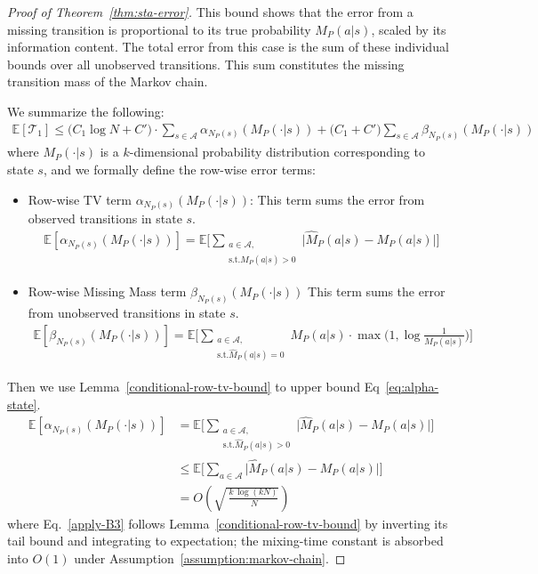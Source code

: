 \documentclass{article}
\theoremstyle{plain}
\theoremstyle{definition}
\theoremstyle{remark}
\begin{document}
\begin{proof}[Proof of Theorem~\ref{thm:sta-error}]
This bound shows that the error from a missing transition is proportional to its true probability $M_P(a|s)$, scaled by its information content. The total error from this case is the sum of these individual bounds over all unobserved transitions. This sum constitutes the missing transition mass of the Markov chain.


We summarize the following: 
\begin{align}
    \mathbb E[\mathcal{T}_1] \leq\big(C_1\log N+C'\big)\cdot\sum_{s\in \mathcal{A}}\alpha_{N_P(s)}(M_P(\cdot|s))+\big(C_1+C'\big)\sum_{s\in \mathcal{A}}\beta_{N_P(s)}(M_P(\cdot|s)) \label{eq:Expectation-T1}
\end{align}
where $M_P(\cdot|s)$ is a $k$-dimensional probability distribution corresponding to state $s$, and we formally define the row-wise error terms:


 \begin{itemize}
    \item Row-wise TV term $\alpha_{N_P(s)}(M_P(\cdot|s))$: This term sums the error from observed transitions in state $s$.
    \begin{align}
        \mathbb E[\alpha_{N_P(s)}(M_P(\cdot|s))]  = \mathbb E \bigg[ \sum_{\substack{a \in \mathcal{A}, \\ \text{s.t.} \hat M_P(a|s)>0} } \big|\hat M_P(a|s)-M_P(a|s)\big|\bigg] \label{eq:alpha-state}
    \end{align}
    \item Row-wise Missing Mass term $\beta_{N_P(s)}(M_P(\cdot|s))$ This term sums the error from unobserved transitions in state $s$.
    \begin{align}
        \mathbb E[\beta_{N_P(s)}(M_P(\cdot|s))]= \mathbb E \bigg[ \sum_{\substack{a \in \mathcal{A}, \\ \text{s.t.} \hat M_P(a|s)=0} } M_P(a|s) \cdot \max \Big(1,\log \frac{1}{M_P(a|s)}\Big)\bigg]
    \end{align}
\end{itemize}
Then we use Lemma~\ref{conditional-row-tv-bound} to upper bound Eq~\ref{eq:alpha-state}.
\begin{align}
    \mathbb E[\alpha_{N_P(s)}(M_P(\cdot|s))] &= \mathbb E \bigg[ \sum_{\substack{a \in \mathcal{A}, \\ \text{s.t.} \hat M_P(a|s)>0} } \big|\hat M_P(a|s)-M_P(a|s)\big|\bigg]\\ &\leq \mathbb E \bigg[ \sum_{a \in \mathcal{A} } \big|\hat M_P(a|s)-M_P(a|s)\big|\bigg] \\
    & = O(\sqrt{\,\frac{k \, \log\left(k N\right)}{\,N}} ) \label{apply-B3}
\end{align}
where Eq.~\ref{apply-B3} follows Lemma~\ref{conditional-row-tv-bound} by inverting its tail bound and integrating to expectation;
the mixing-time constant is absorbed into $O(1)$ under Assumption~\ref{assumption:markov-chain}.


\end{proof}
\end{document}
